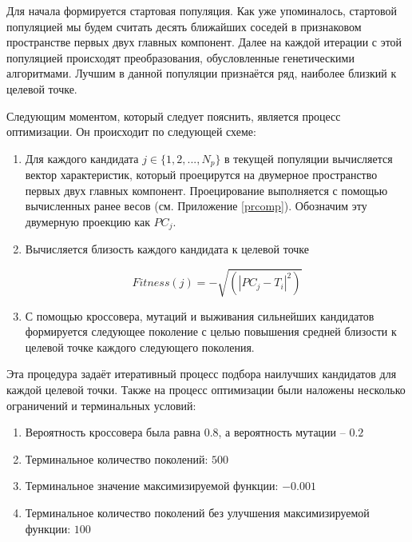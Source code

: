 \documentclass[a4paper,12pt]{article}
\begin{document}
Для начала формируется стартовая популяция. Как уже упоминалось, стартовой популяцией мы будем считать десять ближайших соседей в признаковом пространстве первых двух главных компонент. Далее на каждой итерации с этой популяцией происходят преобразования, обусловленные генетическими алгоритмами. Лучшим в данной популяции признаётся ряд, наиболее близкий к целевой точке.

Следующим моментом, который следует пояснить, является процесс оптимизации. Он происходит по следующей схеме: 
	
	\begin{enumerate}
		\item Для каждого кандидата $ j \in \{1, 2, ..., N_p\} $ в текущей популяции вычисляется вектор характеристик, который проецирутся на двумерное пространство первых двух главных компонент. Проецирование выполняется с помощью вычисленных ранее весов (см. Приложение \ref{prcomp}). Обозначим эту двумерную проекцию как $ PC_j $.
		
		\item Вычисляется близость каждого кандидата к целевой точке
		
		\[ Fitness(j) = -\sqrt{(|PC_j - T_i|^2)} \]
		
		\item С помощью кроссовера, мутаций и выживания сильнейших кандидатов формируется следующее поколение с целью повышения средней близости к целевой точке каждого следующего поколения. 
	\end{enumerate}

Эта процедура задаёт итеративный процесс подбора наилучших кандидатов для каждой целевой точки. Также на процесс оптимизации были наложены несколько ограничений и терминальных условий:

\begin{enumerate}[\Sun]
	\item Вероятность кроссовера была равна $ 0.8 $, а вероятность мутации -- $ 0.2 $
	\item Терминальное количество поколений: $ 500 $
	
	\item Терминальное значение максимизируемой функции: $ -0.001 $
	
	\item Терминальное количество поколений без улучшения максимизируемой функции: $ 100 $
\end{enumerate}
\end{document}
